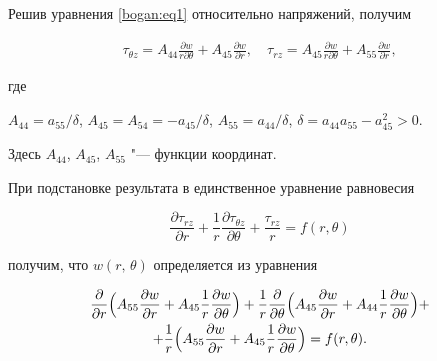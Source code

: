 Решив  уравнения \eqref{bogan:eq1} относительно напряжений, получим

\begin{gather*}

\tau_{\theta z}= A_{44}\frac{\partial w}{r \partial

\theta}+A_{45}\frac{\partial w}{\partial r},\quad 

\tau_{r z}=A_{45}\frac{\partial w}{r \partial

\theta}+A_{55}\frac{\partial w}{\partial r},

\end{gather*}

где

$A_{44}={a_{55}}/{\delta}$, $A_{45}=A_{54}=-{a_{45}}/{\delta}$, $A_{55}={a_{44}}/{\delta}$, $\delta=a_{44}a_{55}-a_{45}^2

>0$.

Здесь $ A_{44}$, $ A_{45}$, $ A_{55}$ "--- функции координат. 

При подстановке результата в единственное уравнение равновесия

\begin{equation*}

\frac{\partial \tau_{r z} }{\partial r}+ \frac{1}{r}\frac{\partial

\tau_{\theta z}}{\partial \theta }+\frac{\tau_{r

z}}{r}=f(r,\theta)

\end{equation*}

получим, что $w(r,\,\theta)$ определяется из уравнения

\begin{multline}

\label{bogan:eq2}

\frac{\partial}{\partial r}\Bigl( A_{55}\frac{\partial w}{\partial r}+

A_{45}\frac{1}{r}\frac{\partial w}{\partial \theta}\Bigr )+

\frac{1}{r}\frac{\partial}{\partial \theta}\Bigl(A_{45}\frac{\partial w}{\partial r}+

A_{44}\frac{1}{r}\frac{\partial w}{\partial \theta}\Bigr) +\\

+\frac{1}{r}\Bigl( A_{55}\frac{\partial w}{\partial

r}+A_{45}\frac{1}{r}\frac{\partial w}{\partial \theta}\Bigr

)=f(r, \theta).

\end{multline}


